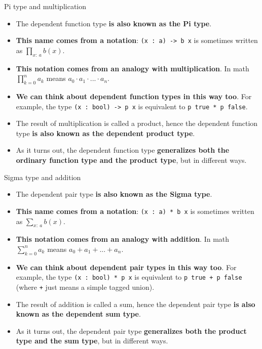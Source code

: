 \documentclass{beamer}
\newcommand{\m}[1]{\texttt{#1}}
\begin{document}
\begin{frame}{Pi type and multiplication}
\begin{itemize}
	\item The dependent function type \textbf{is also known as the Pi type}.
	\item \textbf{This name comes from a notation}: \m{(x :\ a) -> b x} is sometimes written as $\displaystyle \prod_{x :\ a} b(x)$.
	\item \textbf{This notation comes from an analogy with multiplication}. In math $\displaystyle \prod_{k = 0}^n a_k$ means $a_0 \cdot a_1 \cdot ... \cdot a_n$.
	\item \textbf{We can think about dependent function types in this way too}. For example, the type \m{(x :\ bool) -> p x} is equivalent to \m{p true * p false}.
	\item The result of multiplication is called a product, hence the dependent function type \textbf{is also known as the dependent product type}.
	\item As it turns out, the dependent function type \textbf{generalizes both the ordinary function type and the product type}, but in different ways.
\end{itemize}
\end{frame}

\begin{frame}{Sigma type and addition}
\begin{itemize}
	\item The dependent pair type \textbf{is also known as the Sigma type}.
	\item \textbf{This name comes from a notation}: \m{(x :\ a) * b x} is sometimes written as $\displaystyle \sum_{x :\ a} b(x)$.
	\item \textbf{This notation comes from an analogy with addition}. In math $\displaystyle \sum_{k = 0}^n a_k$ means $a_0 + a_1 + ... + a_n$.
	\item \textbf{We can think about dependent pair types in this way too}. For example, the type \m{(x :\ bool) * p x} is equivalent to \m{p true + p false} (where \m{+} just means a simple tagged union).
	\item The result of addition is called a sum, hence the dependent pair type \textbf{is also known as the dependent sum type}.
	\item As it turns out, the dependent pair type \textbf{generalizes both the product type and the sum type}, but in different ways.
\end{itemize}
\end{frame}
\end{document}

